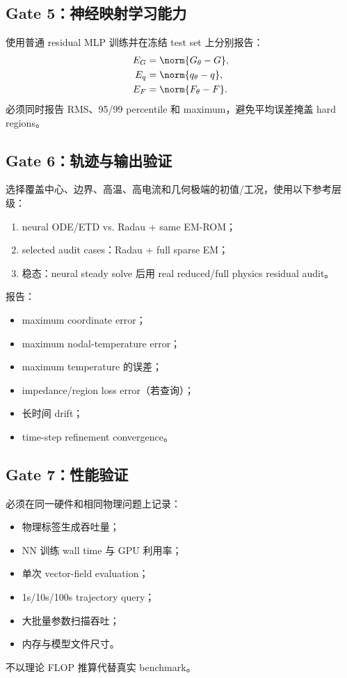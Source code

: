 \subsection{Gate 5：神经映射学习能力}
使用普通 residual MLP 训练并在冻结 test set 上分别报告：
\begin{align}
E_G &= \norm{G_\theta-G},\\
E_q &= \norm{q_\theta-q},\\
E_F &= \norm{F_\theta-F}.
\end{align}
必须同时报告 RMS、95/99 percentile 和 maximum，避免平均误差掩盖 hard regions。

\subsection{Gate 6：轨迹与输出验证}
选择覆盖中心、边界、高温、高电流和几何极端的初值/工况，使用以下参考层级：
\begin{enumerate}
  \item neural ODE/ETD vs. Radau + same EM-ROM；
  \item selected audit cases：Radau + full sparse EM；
  \item 稳态：neural steady solve 后用 real reduced/full physics residual audit。
\end{enumerate}
报告：
\begin{itemize}
  \item maximum coordinate error；
  \item maximum nodal-temperature error；
  \item maximum temperature 的误差；
  \item impedance/region loss error（若查询）；
  \item 长时间 drift；
  \item time-step refinement convergence。
\end{itemize}

\subsection{Gate 7：性能验证}
必须在同一硬件和相同物理问题上记录：
\begin{itemize}
  \item 物理标签生成吞吐量；
  \item NN 训练 wall time 与 GPU 利用率；
  \item 单次 vector-field evaluation；
  \item 1s/10s/100s trajectory query；
  \item 大批量参数扫描吞吐；
  \item 内存与模型文件尺寸。
\end{itemize}
不以理论 FLOP 推算代替真实 benchmark。

